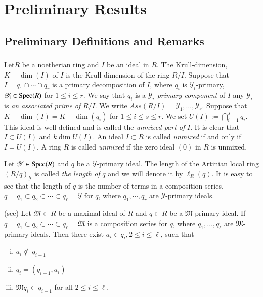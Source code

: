 \chapter{Preliminary Results}\label{chap1}

\section{Preliminary Definitions and Remarks}\label{chap1:sec1}

\subsection{}\label{chap1:sec1:subsection1.1}
Let\pageoriginale $R$ be a noetherian ring and $I$ be an ideal in $R$. The
Krull-dimension, $K-\dim(I)$ of $I$ is the Krull-dimension of the ring
$R/I$. Suppose that $I=q_1\cap\cdots \cap q_r$ is a primary
decomposition of $I$, where $q_i$ is $\mathscr{Y}_i$-primary,
$\mathscr{Y}_i \in  
\operatorname{Spec} (R)$ for $1\leq i \leq r$. We say that $q_i$ is a
$\mathscr{Y}_i$\textit{-primary component } of $I$ any $\mathscr{Y}_i$
is \textit{ an associated prime of } $R/I$. We write $Ass
(R/I)={\mathscr{Y}_1,\ldots, \mathscr{Y}_r}$. Suppose that $K-\dim (I)
= K -\dim (q_i)$ for $1\leq i \leq s \leq r$. We set $U(I):=
\bigcap\limits^s_{i=1} q_i$. This ideal is well defined and is called
the \textit{ unmixed part of } $I$. It is clear that $I\subset U(I)$
and $k \dim U(I)$. An ideal $I \subset R$ is called \textit{unmixed} if
and only if $I= U(I)$. A ring $R$ is called \textit{unmixed} if 
the zero ideal $(0)$ in $R$ is unmixed.  

Let $\mathscr{Y}\in  \operatorname{Spec} (R)$ and $q$ be a
$\mathscr{Y}$-primary ideal. The length of the Artinian local ring
$(R/q)_{\mathscr{Y}}$ is called \textit{ the length of } $q$ and we
will denote it by $\ell_R(q)$. It is easy to see that the length of
$q$ is the number of terms in a composition series, $q=q_1\subset
q_2\subset \cdots \subset q_\ell = \mathscr{Y}$ for $q$, where
$q_1,\cdots, q_r$ are $\mathscr{Y}$-primary ideals.  

\begin{remark*}
  (see) Let
  $\mathfrak{M} \subset R$ be a maximal ideal of $R$ and $q \subset R$
  be a $\mathfrak{M}$ primary ideal. If $q=q_1\subset q_2\subset \cdots
  \subset q_\ell = \mathfrak{M}$  is a composition series for $q$,
  where $q_1,\ldots, q_\ell$ are  $\mathfrak{M}$-primary ideals. Then
  there exist $a_i \in q_i, 2\leq i \leq \ell$, such that  
  \begin{enumerate}[(i)]
  \item $a_i \not\notin~q_{i-1}$
  \item $q_i=(q_{i-1}, a_i)$
  \item $\mathfrak{M}q_i\subset q_{i-1}$  for all $2 \leq i \leq \ell $.
  \end{enumerate}
\end{remark*}


